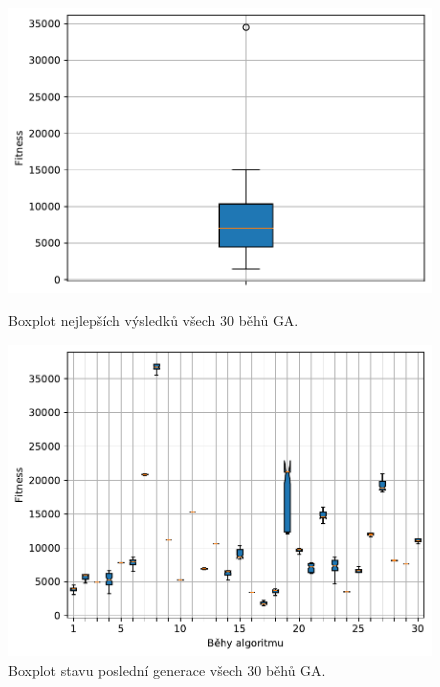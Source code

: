 \begin{figure}[H]
\begin{minipage}[t]{0.475\linewidth}
\includegraphics[width=\linewidth]{obrazky-figures/statistics/Benchmarks/Rosenbrock/GA/bestsBoxplot_WithOutliers.pdf}
\caption{Boxplot nejlepších výsledků všech $30$ běhů GA.}
\label{fg:bench:rosenbrock:ga:best}
\end{minipage}
\hfill
\begin{minipage}[t]{0.475\linewidth}
\includegraphics[width=\linewidth]{obrazky-figures/statistics/Benchmarks/Rosenbrock/GA/lastGenBoxplots.pdf}
\caption{Boxplot stavu poslední generace všech $30$ běhů GA.}
\label{fg:bench:rosenbrock:ga:lastGen}
\end{minipage}
\end{figure}

